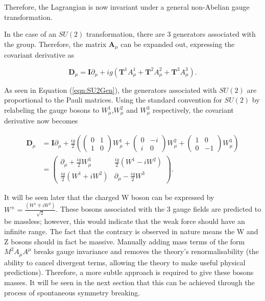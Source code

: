 \documentclass{article}
\begin{document}
Therefore, the Lagrangian is now invariant under a general non-Abelian gauge transformation. 

In the case of an $SU(2)$ transformation, there are 3 generators associated with the group. Therefore, the matrix $\bm{A}_\mu$ can be expanded out, expressing the covariant derivative as

\begin{equation}
\bm{D}_\mu = \bm{I}\partial_\mu + ig(\bm{T}^1 A^{1}_\mu + \bm{T}^2 A^{2}_\mu + \bm{T}^3 A^{3}_\mu).
\end{equation}

As seen in Equation (\ref{eqn:SU2Gen}), the generators associated with $SU(2)$ are proportional to the Pauli matrices. Using the standard convention for $SU(2)$ by relabeling the gauge bosons to $W^{1}_\mu$,$W^{2}_\mu$ and $W^{3}_\mu$ respectively, the covariant derivative now becomes


\begin{equation}
\begin{split}
\bm{D}_\mu & = \bm{I}\partial_\mu + \frac{ig}{2}\left( \left(
\begin{matrix}
0 & 1 \\
1 & 0
\end{matrix}\right) W^{1}_\mu + \left(
\begin{matrix}
0 & -i \\
i & 0
\end{matrix}\right)W^{2}_\mu + \left(
\begin{matrix}
1 & 0 \\
0 & -1
\end{matrix}\right)W^{3}_\mu
\right) \\
& = \left(
\begin{matrix}
\partial_\mu + \frac{ig}{2}W^{3}_\mu & \frac{ig}{2}(W^1 -iW^2 ) \\
\frac{ig}{2}(W^1 + iW^2) & \partial_\mu - \frac{ig}{2}W^3
\end{matrix} \right).
\end{split}
\end{equation}

It will be seen later that the charged W boson can be expressed by $W^{\pm} = \frac{(W^1 \mp iW^2)}{\sqrt{2}}$. These bosons associated with the 3 gauge fields are predicted to be massless; however, this would indicate that the weak force should have an infinite range. The fact that the contrary is observed in nature means the W and Z bosons should in fact be massive. Manually adding mass terms of the form $M^2A_\mu A^\mu$ breaks gauge invariance and removes the theory's renormalisability (the ability to cancel divergent terms, allowing the theory to make useful physical predictions). Therefore, a more subtle approach is required to give these bosons masses. It will be seen in the next section that this can be achieved through the process of spontaneous symmetry breaking.
\end{document}
